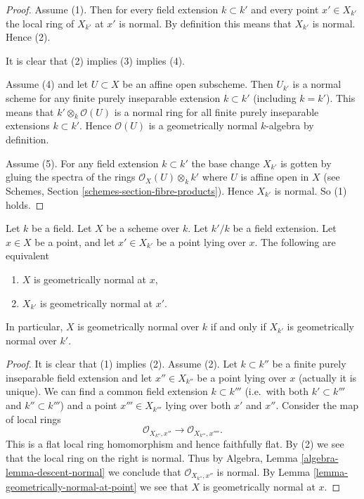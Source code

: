 \begin{proof}
Assume (1). Then for every field extension $k \subset k'$ and
every point $x' \in X_{k'}$ the local ring of $X_{k'}$ at $x'$
is normal. By definition this means that $X_{k'}$ is normal.
Hence (2).

\medskip\noindent
It is clear that (2) implies (3) implies (4).

\medskip\noindent
Assume (4) and let $U \subset X$ be an affine open subscheme.
Then $U_{k'}$ is a normal scheme for any finite purely inseparable
extension $k \subset k'$ (including $k = k'$). This means that
$k' \otimes_k \mathcal{O}(U)$ is a normal ring for all
finite purely inseparable extensions $k \subset k'$. Hence
$\mathcal{O}(U)$ is a geometrically normal $k$-algebra by definition.

\medskip\noindent
Assume (5). For any field extension $k \subset k'$ the base
change $X_{k'}$ is gotten by gluing the spectra of the
rings $\mathcal{O}_X(U) \otimes_k k'$ where $U$ is affine open
in $X$ (see Schemes, Section \ref{schemes-section-fibre-products}).
Hence $X_{k'}$ is normal. So (1) holds.
\end{proof}

\begin{lemma}
\label{lemma-geometrically-normal-upstairs}
Let $k$ be a field.
Let $X$ be a scheme over $k$.
Let $k'/k$ be a field extension.
Let $x \in X$ be a point, and let $x' \in X_{k'}$ be a point lying over $x$.
The following are equivalent
\begin{enumerate}
\item $X$ is geometrically normal at $x$,
\item $X_{k'}$ is geometrically normal at $x'$.
\end{enumerate}
In particular, $X$ is geometrically normal over $k$ if and only if
$X_{k'}$ is geometrically normal over $k'$.
\end{lemma}

\begin{proof}
It is clear that (1) implies (2). Assume (2).
Let $k \subset k''$ be a finite purely inseparable field extension
and let $x'' \in X_{k''}$ be a point lying over $x$ (actually it is
unique). We can find a common field extension $k \subset k'''$
(i.e.\ with both $k' \subset k'''$ and $k'' \subset k'''$) and a point
$x''' \in X_{k'''}$ lying over both $x'$ and $x''$.
Consider the map of local rings
$$
\mathcal{O}_{X_{k''}, x''} \longrightarrow \mathcal{O}_{X_{k'''}, x''''}.
$$
This is a flat local ring homomorphism and hence faithfully flat.
By (2) we see that the local ring on the right is normal.
Thus by Algebra, Lemma \ref{algebra-lemma-descent-normal}
we conclude that $\mathcal{O}_{X_{k''}, x''}$ is normal.
By Lemma \ref{lemma-geometrically-normal-at-point} we see that $X$
is geometrically normal at $x$.
\end{proof}

